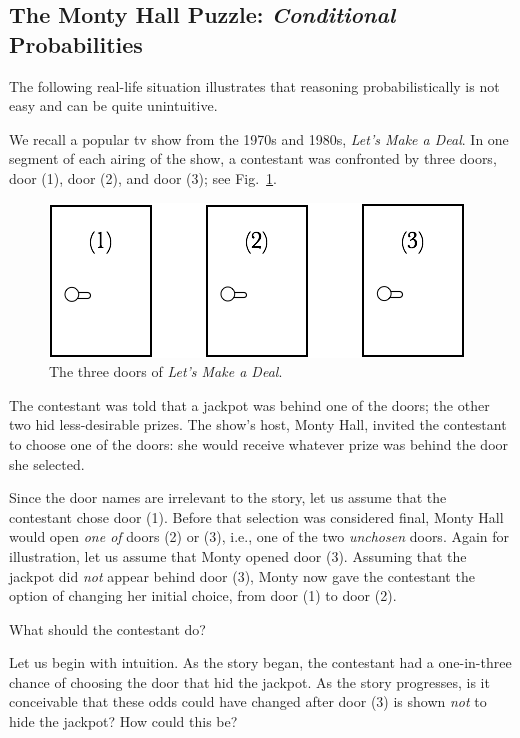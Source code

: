 \subsection{The Monty Hall Puzzle: {\em Conditional} Probabilities}
\label{sec:monty-hall}

The following real-life situation illustrates that reasoning
probabilistically is not easy and can be quite unintuitive.

We recall a popular tv show from the 1970s and 1980s, \textit{Let's
  Make a Deal}. In one segment of each airing of the show, a
contestant was confronted by three doors, door (1), door (2), and door
(3); see Fig.~\ref{fig:MonthyHal-1}.
\begin{figure}[htb]
\begin{center}
        \includegraphics[scale=0.4]{FiguresMaths/MonthyHallInitial}
        \caption{The three doors of \textit{Let's Make a Deal}.}
        \label{fig:MonthyHal-1}
\end{center}
\end{figure}
The contestant was told that a jackpot was behind one of the doors;
the other two hid less-desirable prizes.  The show's host, Monty Hall,
invited the contestant to choose one of the doors:
she would receive whatever prize was behind the door she selected.

Since the door names are irrelevant to the story, let us assume that
the contestant chose door (1).  Before that selection was considered
final, Monty Hall would open {\em one of} doors (2) or (3), i.e., one
of the two {\em unchosen} doors.  Again for illustration, let us
assume that Monty opened door (3).  Assuming that the jackpot did {\em not} appear 
behind door (3), Monty now gave the contestant the
option of changing her initial choice, from door (1) to door (2).

What should the contestant do?  

Let us begin with intuition.  As the story began, the contestant had a
one-in-three chance of choosing the door that hid the jackpot.  As the
story progresses, is it conceivable that these odds could have changed after door
(3) is shown {\em not} to hide the jackpot?  How could this be?

